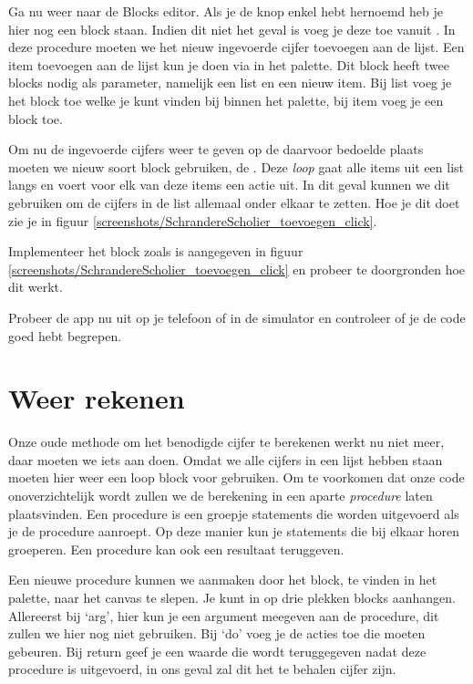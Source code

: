 Ga nu weer naar de Blocks editor. Als je de knop enkel hebt hernoemd heb je hier nog een block  staan. Indien dit niet het geval is voeg je deze toe vanuit . In deze procedure moeten we het nieuw ingevoerde cijfer toevoegen aan de lijst. Een item toevoegen aan de lijst kun je doen via  in het  palette. Dit block heeft twee blocks nodig als parameter, namelijk een list en een nieuw item. Bij list voeg je het  block toe welke je kunt vinden bij  binnen het  palette, bij item voeg je een block  toe. 

Om nu de ingevoerde cijfers weer te geven op de daarvoor bedoelde plaats moeten we nieuw soort block gebruiken, de . Deze \emph{loop} gaat alle items uit een list langs en voert voor elk van deze items een actie uit. In dit geval kunnen we dit gebruiken om de cijfers in de list allemaal onder elkaar te zetten. Hoe je dit doet zie je in figuur \ref{screenshots/SchrandereScholier_toevoegen_click}.

 \begin{opgave}
    \opgVraag
Implementeer het  block zoals is aangegeven in figuur \ref{screenshots/SchrandereScholier_toevoegen_click} en probeer te doorgronden hoe dit werkt.
\end{opgave}

\runOpTelefoon{} Probeer de app nu uit op je telefoon of in de simulator en controleer of je de code goed hebt begrepen.

\section{Weer rekenen}
Onze oude methode om het benodigde cijfer te berekenen werkt nu niet meer, daar moeten we iets aan doen. Omdat we alle cijfers in een lijst hebben staan moeten hier weer een loop block voor gebruiken. Om te voorkomen dat onze code onoverzichtelijk wordt zullen we de berekening in een aparte \emph{procedure} laten plaatsvinden. Een procedure is een groepje statements die worden uitgevoerd als je de procedure aanroept. Op deze manier kun je statements die bij elkaar horen groeperen. Een procedure kan ook een resultaat teruggeven.

Een nieuwe procedure kunnen we aanmaken door het  block, te vinden in het  palette, naar het canvas te slepen. Je kunt in op drie plekken blocks aanhangen. Allereerst bij `arg', hier kun je een argument meegeven aan de procedure, dit zullen we hier nog niet gebruiken. Bij `do' voeg je de acties toe die moeten gebeuren. Bij return geef je een waarde die wordt teruggegeven nadat deze procedure is uitgevoerd, in ons geval zal dit het te behalen cijfer zijn.

